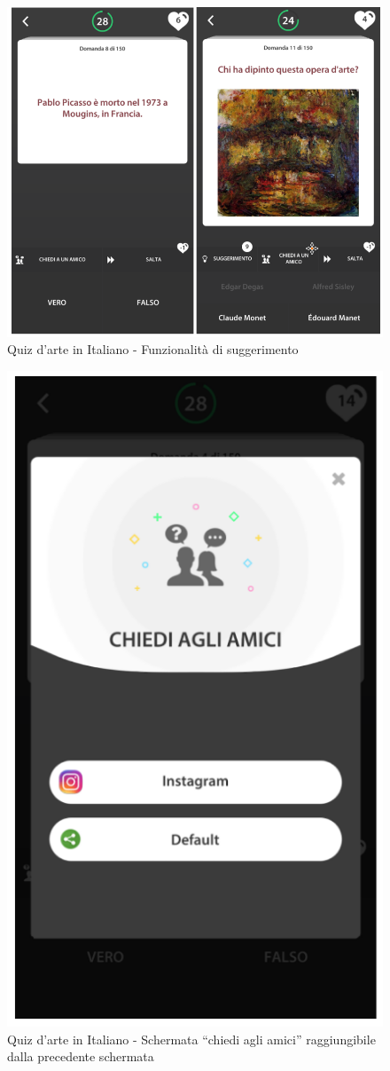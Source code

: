 \documentclass{article}
\begin{document}
\begin{figure}[htp]
\begin{center}
\includegraphics[width=1 \textwidth]{Figure19.png}
\caption{Quiz d’arte in Italiano - Funzionalità di suggerimento}
\end{center}
\end{figure}

\begin{figure}[htp]
\begin{center}
\includegraphics[width=0.5 \textwidth]{Figure20.png}
\caption{Quiz d’arte in Italiano - Schermata “chiedi agli amici” raggiungibile dalla precedente schermata}
\end{center}
\end{figure}
\end{document}

